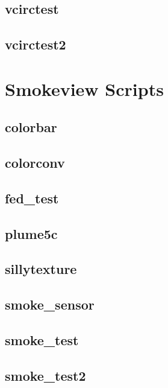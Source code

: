 \documentclass[11pt,twoside]{book}
\begin{document}
\section{vcirctest}

\section{vcirctest2}

\chapter{Smokeview Scripts}
\label{smvscripts}

\section{colorbar}
\label{SSFcolorbar}

\section{colorconv}
\label{SSFcolorconv}

\section{fed\_test}

\section{plume5c}
\label{SSFplume5c}

\section{sillytexture}

\section{smoke\_sensor}
\label{SSFsmokesensor}

\section{smoke\_test}
\label{SSFsmoketest}

\section{smoke\_test2}
\label{SSFsmoketest2}
\end{document}
